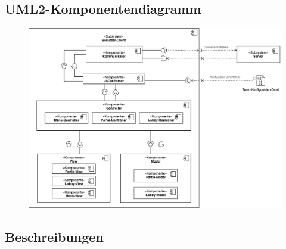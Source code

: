 \subsection{UML2-Komponentendiagramm}
    \begin{center}
        \begin{figure}[H]
        \centering
        \includegraphics[scale=0.13]{images/komponentendiagramm_benutzer-client.png}
    \end{figure}
    \end{center}
    

\subsection{Beschreibungen}

